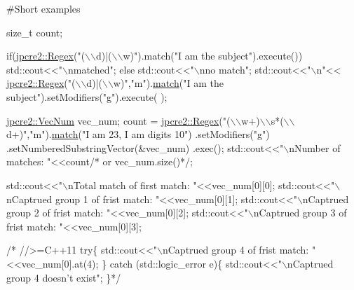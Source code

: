  \#\+Short examples


\begin{DoxyCode}
\textcolor{keywordtype}{size\_t} count;

\textcolor{keywordflow}{if}(\hyperlink{classjpcre2_1_1Regex}{jpcre2::Regex}(\textcolor{stringliteral}{"(\(\backslash\)\(\backslash\)d)|(\(\backslash\)\(\backslash\)w)"}).match(\textcolor{stringliteral}{"I am the subject"}).execute()) 
    std::cout<<\textcolor{stringliteral}{"\(\backslash\)nmatched"};
\textcolor{keywordflow}{else}
    std::cout<<\textcolor{stringliteral}{"\(\backslash\)nno match"};
std::cout<<\textcolor{stringliteral}{"\(\backslash\)n"}<<
    \hyperlink{classjpcre2_1_1Regex}{jpcre2::Regex}(\textcolor{stringliteral}{"(\(\backslash\)\(\backslash\)d)|(\(\backslash\)\(\backslash\)w)"},\textcolor{stringliteral}{"m"}).\hyperlink{classjpcre2_1_1Regex_ab93775a93a0a537d09b9e9ab4a5a3894}{match}(\textcolor{stringliteral}{"I am the subject"}).setModifiers(\textcolor{stringliteral}{"g"}).execute(
      );


\hyperlink{namespacejpcre2_ac1cf752c8fbb0be78020be3b80e77ce3}{jpcre2::VecNum} vec\_num;
count = 
\hyperlink{classjpcre2_1_1Regex}{jpcre2::Regex}(\textcolor{stringliteral}{"(\(\backslash\)\(\backslash\)w+)\(\backslash\)\(\backslash\)s*(\(\backslash\)\(\backslash\)d+)"},\textcolor{stringliteral}{"m"}).\hyperlink{classjpcre2_1_1Regex_ab93775a93a0a537d09b9e9ab4a5a3894}{match}(\textcolor{stringliteral}{"I am 23, I am digits 10"})
                                     .setModifiers(\textcolor{stringliteral}{"g"})
                                     .setNumberedSubstringVector(&vec\_num)
                                     .exec();
std::cout<<\textcolor{stringliteral}{"\(\backslash\)nNumber of matches: "}<<count\textcolor{comment}{/* or vec\_num.size()*/};

std::cout<<\textcolor{stringliteral}{"\(\backslash\)nTotal match of first match: "}<<vec\_num[0][0];      
std::cout<<\textcolor{stringliteral}{"\(\backslash\)nCaptrued group 1 of frist match: "}<<vec\_num[0][1]; 
std::cout<<\textcolor{stringliteral}{"\(\backslash\)nCaptrued group 2 of frist match: "}<<vec\_num[0][2]; 
std::cout<<\textcolor{stringliteral}{"\(\backslash\)nCaptrued group 3 of frist match: "}<<vec\_num[0][3]; 

\textcolor{comment}{/* //>=C++11}
\textcolor{comment}{try\{}
\textcolor{comment}{    std::cout<<"\(\backslash\)nCaptrued group 4 of frist match: "<<vec\_num[0].at(4);}
\textcolor{comment}{\} catch (std::logic\_error e)\{}
\textcolor{comment}{    std::cout<<"\(\backslash\)nCaptrued group 4 doesn't exist";}
\textcolor{comment}{\}*/}


\end{DoxyCode}
